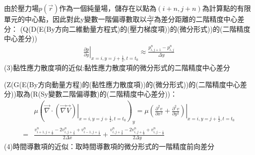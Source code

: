 \documentclass[12pt]{article}
\begin{document}
由於壓力場$p(\vec{r})$作為一個純量場，儲存在以點為$(i+n,j+n)$為計算點的有限單元的中心點，因此對此y變數一階偏導數取以$\frac{\Delta y}{2}$為差分距離的二階精度中心差分：
\noindent 
(Q(D(E(By方向二維動量方程式)的(壓力梯度項))的(微分形式))的(二階精度中心差分))\\[1.5ex]
\begin{equation}\begin{split}
    \left.\frac{\partial p}{\partial y}\right|_{x = i , y = j+\frac{1}{2} , t=  t_0} \approx \frac{p_{i,j+1}^{n} - p_{i,j}^{n}}{\Delta y}
\end{split}\end{equation}
\noindent (3)黏性應力散度項的近似:黏性應力散度項的微分形式的二階精度中心差分

(Z(G(E(By方向動量方程)的(黏性應力散度項))的(微分形式))的(二階精度中心差分))取為(R(Sy變數二階偏導數)的(二階精度中心差分))：
\begin{equation}\begin{split}
    &\mu\left(\left.\vec{\nabla}\cdot(\vec{\nabla} \vec{V})\right|_{x = i,y = j+\frac{1}{2} , t = t_0}\right)_{y}
    =\mu \left.(\frac{\partial^{2} v}{\partial x^{2}} + \frac{\partial^{2} v}{\partial y^{2}})\right|_{x = i,y = j+\frac{1}{2} , t=t_0}\\[1.5ex]
    =&\frac{v_{i+1,j+\frac{1}{2}}^{n} -2v_{i,j+\frac{1}{2}}^{n} + v_{i-1,j+\frac{1}{2}}^{n}}{2\Delta x} + \frac{v_{i,j+\frac{3}{2}}^{n} - 2v_{i,j+\frac{1}{2}}^{n} + v_{i,j-\frac{1}{2}}^{n}}{2\Delta y}
\end{split}\end{equation}
\noindent  (4)時間導數項的近似：取時間導數項的微分形式的一階精度前向差分
\end{document}
